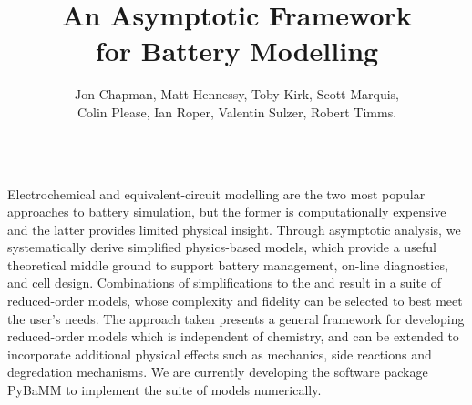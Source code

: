 \documentclass{beamer}
\author[]{
  	Jon Chapman,
  	Matt Hennessy,
  	Toby Kirk,
	Scott Marquis,\\
  	Colin Please,
  	Ian Roper,
	Valentin Sulzer,
	Robert Timms.
}
\title{An Asymptotic Framework\\ for Battery Modelling}
\institute{Your Institution}
\begin{document}
\begin{frame}[fragile]
\centering

\vspace{-2em}
\begin{columns}
  \begin{column}{0.87\linewidth}
	\begin{topblock}{}
	  \small

Electrochemical and equivalent-circuit modelling are the two most popular approaches to battery simulation, but the former is computationally expensive and the latter provides limited physical insight. Through asymptotic analysis, we systematically derive simplified physics-based models, which provide a useful theoretical middle ground to support battery management, on-line diagnostics, and cell design. Combinations of simplifications to the {} and {} result in a suite of reduced-order models, whose complexity and fidelity can be selected to best meet the user's needs. The approach taken presents a general framework for developing reduced-order models which is independent of chemistry, and can be extended to incorporate additional physical effects such as mechanics, side reactions and degredation mechanisms. We are currently developing the software package PyBaMM to implement the suite of models numerically.


\end{topblock}
  \end{column}
\end{columns}




\end{frame}
\end{document}
